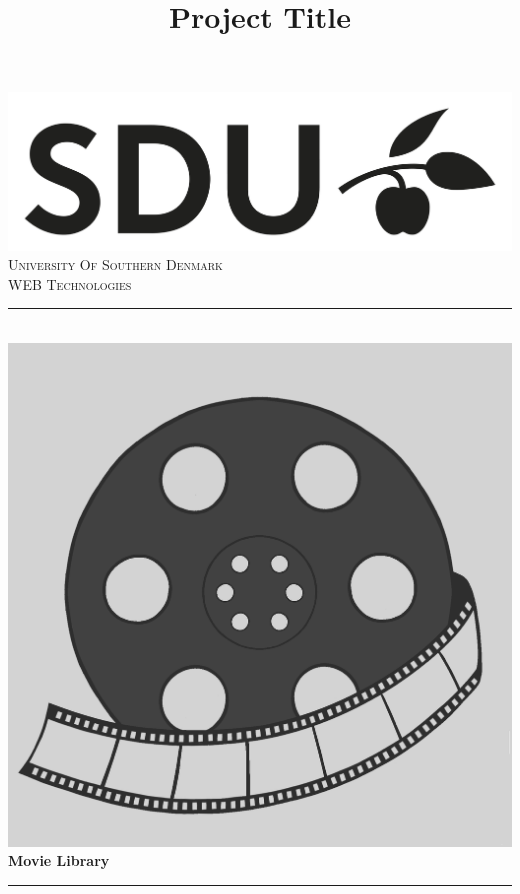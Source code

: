 \documentclass[letterpaper,twocolumn]{article}
\title{Project Title}
\date{}
\newcommand\tab[1][1cm]{\hspace*{#1}}
\begin{document}
\begin{titlepage}
\newcommand{\HRule}{\rule{\linewidth}{0.5mm}} %

\center %

\includegraphics[scale=0.5]{images/SDULogo.png}\\[0.1cm] 


\textsc{University Of Southern Denmark\tab}\\[3cm] 
\textsc{\Large WEB Technologies}\\[0.5cm] 

\HRule \\[0.4cm]
\includegraphics[scale=0.04]{images/Logo.png}\\[0.1cm] 
{ \huge \bfseries Movie Library}\\[0.4cm] %
\HRule \\[1cm]


\end{titlepage}
\end{document}
